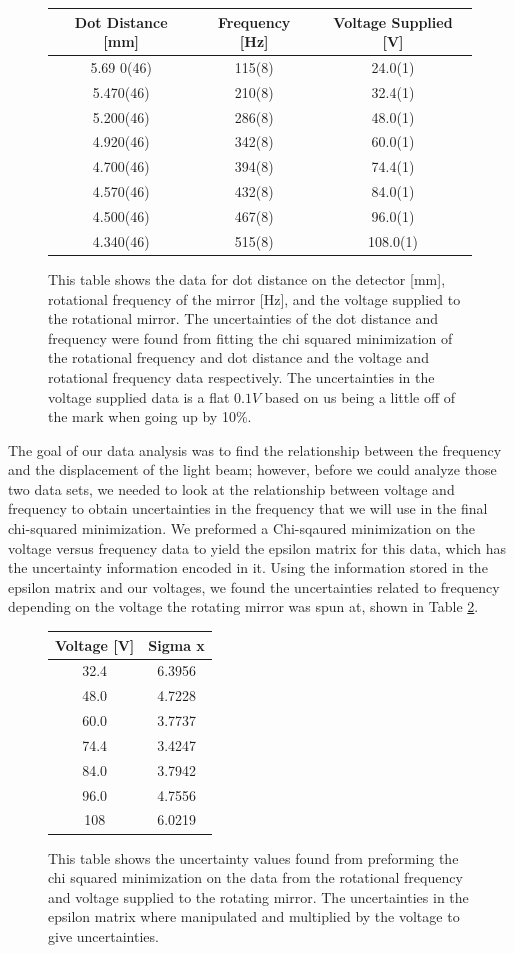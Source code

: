 \documentclass[aps,prl,10pt,twocolumn,floatfix]{revtex4-2}
\begin{document}
\begin{figure}
\begin{tabular}{|c|c|c|}
\hline
Dot Distance [mm] & Frequency [Hz] & Voltage Supplied [V] \\
\hline
5.69	0(46)	&115(8)	&24.0(1)\\
5.470(46)	&210(8)	&32.4(1)\\
5.200(46)	&286(8)	&48.0(1)\\
4.920(46)	&342(8)	&60.0(1)\\
4.700(46)	&394(8)	&74.4(1)\\
4.570(46)	&432(8)	&84.0(1)\\
4.500(46)	&467(8)	&96.0(1)\\
4.340(46)	&515(8)&108.0(1)\\
\hline
\end{tabular}
\caption{This table shows the data for dot distance on the detector [mm], rotational frequency of the mirror [Hz], and the voltage supplied to the rotational mirror. The uncertainties of the dot distance and frequency were found from fitting the chi squared minimization of the rotational frequency and dot distance and the voltage and rotational frequency data respectively. The uncertainties in the voltage supplied data is a flat $0.1V$ based on us being a little off of the mark when going up by 10\%.  }
\label{initial}
\end{figure}

The goal of our data analysis was to find the relationship between the frequency and the displacement of the light beam;
however, before we could analyze those two data sets, we needed to look at the relationship between voltage and frequency to obtain uncertainties in the frequency that we will use in the final chi-squared minimization. 
We preformed a Chi-sqaured minimization on the voltage versus frequency data to yield the epsilon matrix for this data, which has the uncertainty information encoded in it.
Using the information stored in the epsilon matrix and our voltages, we found the uncertainties related to frequency depending on the voltage the rotating mirror was spun at, shown in Table \ref{sigmax}.

\begin{figure}
\begin{tabular}{|c|c|}
\hline
Voltage [V] & Sigma x \\
\hline
32.4	&6.3956\\
48.0	&4.7228\\
60.0	&3.7737\\
74.4	&3.4247\\
84.0	&3.7942\\
96.0	&4.7556\\
108	&6.0219\\
\hline
\end{tabular}
\caption{This table shows the uncertainty values found from preforming the chi squared minimization on the data from the rotational frequency and voltage supplied to the rotating mirror. The uncertainties in the epsilon matrix where manipulated and multiplied by the voltage to give uncertainties.}
\label{sigmax}
\end{figure}
\end{document}
